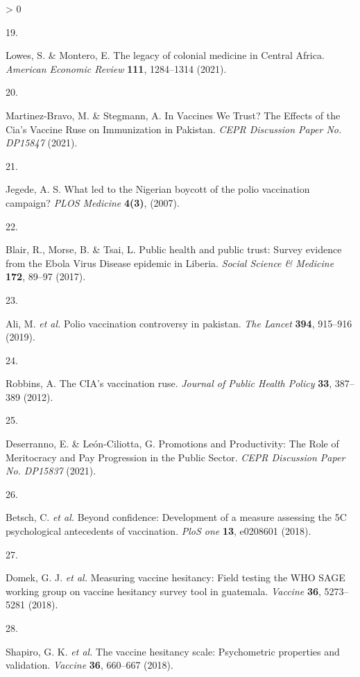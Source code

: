 \documentclass[
  12pt,
]{article}
\newlength{\cslhangindent}
\newlength{\csllabelwidth}
\newenvironment{CSLReferences}[2] %
 {%
  \setlength{\parindent}{0pt}
  \ifodd #1 \everypar{\setlength{\hangindent}{\cslhangindent}}\ignorespaces\fi
  \ifnum #2 > 0
  \setlength{\parskip}{#2\baselineskip}
  \fi
 }%
 {}
\newcommand{\CSLLeftMargin}[1]{\parbox[t]{\csllabelwidth}{#1}}
\newcommand{\CSLRightInline}[1]{\parbox[t]{\linewidth - \csllabelwidth}{#1}\break}
\begin{document}
\begin{CSLReferences}{0}{0}
\leavevmode\hypertarget{ref-Lowes2018}{}%
\CSLLeftMargin{19. }
\CSLRightInline{Lowes, S. \& Montero, E. {The legacy of colonial medicine in Central Africa}. \emph{American Economic Review} \textbf{111}, 1284--1314 (2021).}

\leavevmode\hypertarget{ref-martinez2021vaccines}{}%
\CSLLeftMargin{20. }
\CSLRightInline{Martinez-Bravo, M. \& Stegmann, A. {In Vaccines We Trust? The Effects of the Cia's Vaccine Ruse on Immunization in Pakistan}. \emph{CEPR Discussion Paper No. DP15847} (2021).}

\leavevmode\hypertarget{ref-Jegede2007}{}%
\CSLLeftMargin{21. }
\CSLRightInline{Jegede, A. S. {What led to the Nigerian boycott of the polio vaccination campaign?} \emph{PLOS Medicine} \textbf{4(3)}, (2007).}

\leavevmode\hypertarget{ref-BLAIR201789}{}%
\CSLLeftMargin{22. }
\CSLRightInline{Blair, R., Morse, B. \& Tsai, L. {Public health and public trust: Survey evidence from the Ebola Virus Disease epidemic in Liberia}. \emph{Social Science \& Medicine} \textbf{172}, 89--97 (2017).}

\leavevmode\hypertarget{ref-ali2019polio}{}%
\CSLLeftMargin{23. }
\CSLRightInline{Ali, M. \emph{et al.} Polio vaccination controversy in pakistan. \emph{The Lancet} \textbf{394}, 915--916 (2019).}

\leavevmode\hypertarget{ref-robbins2012cia}{}%
\CSLLeftMargin{24. }
\CSLRightInline{Robbins, A. The CIA's vaccination ruse. \emph{Journal of Public Health Policy} \textbf{33}, 387--389 (2012).}

\leavevmode\hypertarget{ref-deserrano}{}%
\CSLLeftMargin{25. }
\CSLRightInline{Deserranno, E. \& León-Ciliotta, G. {Promotions and Productivity: The Role of Meritocracy and Pay Progression in the Public Sector}. \emph{CEPR Discussion Paper No. DP15837} (2021).}

\leavevmode\hypertarget{ref-betsch2018beyond}{}%
\CSLLeftMargin{26. }
\CSLRightInline{Betsch, C. \emph{et al.} Beyond confidence: Development of a measure assessing the 5C psychological antecedents of vaccination. \emph{PloS one} \textbf{13}, e0208601 (2018).}

\leavevmode\hypertarget{ref-domek2018measuring}{}%
\CSLLeftMargin{27. }
\CSLRightInline{Domek, G. J. \emph{et al.} Measuring vaccine hesitancy: Field testing the WHO SAGE working group on vaccine hesitancy survey tool in guatemala. \emph{Vaccine} \textbf{36}, 5273--5281 (2018).}

\leavevmode\hypertarget{ref-shapiro2018vaccine}{}%
\CSLLeftMargin{28. }
\CSLRightInline{Shapiro, G. K. \emph{et al.} The vaccine hesitancy scale: Psychometric properties and validation. \emph{Vaccine} \textbf{36}, 660--667 (2018).}


\end{CSLReferences}
\end{document}
